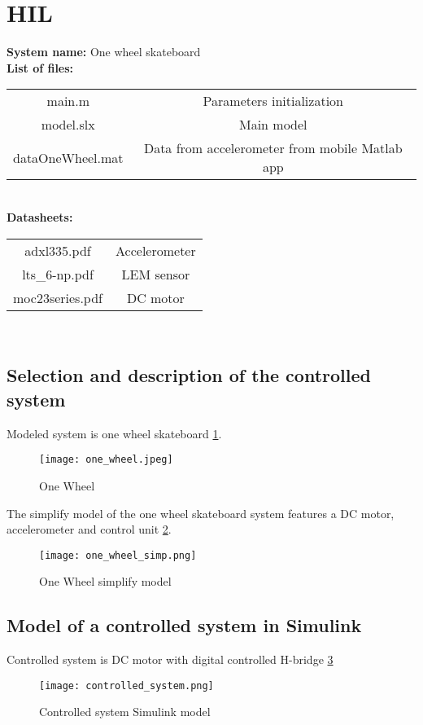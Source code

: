 \documentclass[../report.tex]{subfiles}
\begin{document}
\section{HIL}

\textbf{System name:} One wheel skateboard\\
\textbf{List of files:} 
\begin{tabular}{ |c|c| }
    \hline
    main.m & Parameters initialization \\
    model.slx & Main model \\
    dataOneWheel.mat & Data from accelerometer from mobile Matlab app\\
    \hline
\end{tabular} \\
\textbf{Datasheets:}
\begin{tabular}{ |c|c| }
    \hline
    adxl335.pdf & Accelerometer \\
    lts\_6-np.pdf & LEM sensor \\
    moc23series.pdf & DC motor \\
    \hline
\end{tabular} \\

\subsection{Selection and description of the controlled system}
Modeled system is one wheel skateboard \ref{fig:one_wheel}. 

\begin{figure}[htb!]
    \centering
    \texttt{[image: one\_wheel.jpeg]}
    \caption{One Wheel \cite{one_wheel}}
    \label{fig:one_wheel}
\end{figure}

The simplify model of the one wheel skateboard system features a DC motor,
accelerometer and control unit \ref{fig:one_wheel_simp}.

\begin{figure}[htb!]
    \centering
    \texttt{[image: one\_wheel\_simp.png]}
    \caption{One Wheel simplify model}
    \label{fig:one_wheel_simp}
\end{figure}

\subsection{Model of a controlled system in Simulink}
Controlled system is DC motor with digital controlled H-bridge
\ref{fig:controlled_system}
\begin{figure}[htb!]
    \centering
    \texttt{[image: controlled\_system.png]}
\caption{Controlled system Simulink model}
    \label{fig:controlled_system}
\end{figure}
\end{document}
